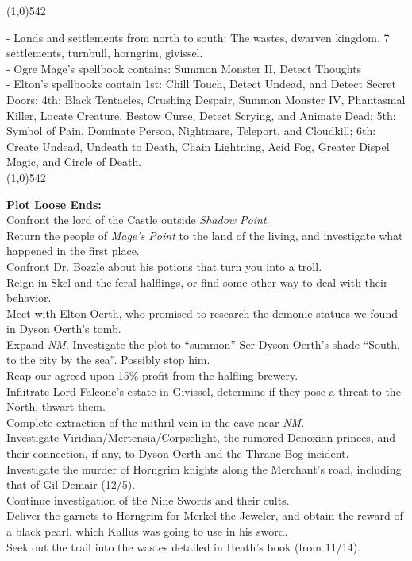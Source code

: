 \documentclass[letterpaper]{article}
\newcommand{\fullline}{\noindent\line(1,0){542} \\}
\begin{document}
\vspace{-1.75em}
\fullline
\vspace{-1.5em}

\noindent - Lands and settlements from north to south: The wastes, dwarven kingdom, 7 settlements, turnbull, horngrim, givissel.\\
\noindent - Ogre Mage's spellbook contains: Summon Monster II, Detect Thoughts\\
\noindent - Elton's spellbooks contain 1st: Chill Touch, Detect Undead, and Detect Secret Doors; 4th: Black Tentacles, Crushing Despair, Summon Monster IV, Phantasmal Killer, Locate Creature, Bestow Curse, Detect Scrying, and Animate Dead; 5th: Symbol of Pain, Dominate Person, Nightmare, Teleport, and Cloudkill; 6th: Create Undead, Undeath to Death, Chain Lightning, Acid Fog, Greater Dispel Magic, and Circle of Death.\\

\vspace{-1.75em}
\fullline
\vspace{-1.5em}

\noindent \textbf{Plot Loose Ends:} \\
Confront the lord of the Castle outside \emph{Shadow Point}.\\
Return the people of \emph{Mage's Point} to the land of the living, and investigate what happened in the first place.\\
Confront Dr. Bozzle about his potions that turn you into a troll.\\
Reign in Skel and the feral halflings, or find some other way to deal with their behavior.\\
Meet with Elton Oerth, who promised to research the demonic statues we found in Dyson Oerth's tomb.\\
Expand \emph{NM}.
Investigate the plot to ``summon'' Ser Dyson Oerth's shade ``South, to the city by the sea''. Possibly stop him.\\
Reap our agreed upon 15\% profit from the halfling brewery.\\
Inflitrate Lord Falcone's estate in Givissel, determine if they pose a threat to the North, thwart them.\\
Complete extraction of the mithril vein in the cave near \emph{NM}.\\
Investigate Viridian/Mertensia/Corpselight, the rumored Denoxian princes, and their connection, if any, to Dyson Oerth and the Thrane Bog incident.\\
Investigate the murder of Horngrim knights along the Merchant's road, including that of Gil Demair (12/5).\\
Continue investigation of the Nine Swords and their cults.\\
Deliver the garnets to Horngrim for Merkel the Jeweler, and obtain the reward of a black pearl, which Kallus was going to use in his sword.\\
Seek out the trail into the wastes detailed in Heath's book (from 11/14).\\
\end{document}
